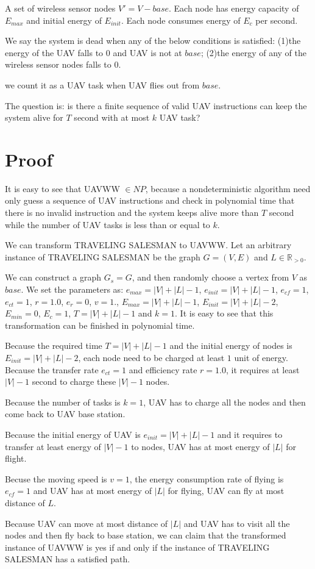 \documentclass[11pt]{article}
\begin{document}
A set of wireless sensor nodes $V' = V - {base}$. Each node has energy capacity of $E_{max}$ and initial energy of $E_{init}$. Each node consumes energy of $E_{c}$ per second.

We say the system is dead when any of the below conditions is satisfied:
(1)the energy of the UAV falls to 0 and UAV is not at $base$;
(2)the energy of any of the wireless sensor nodes falls to 0.

we count it as a UAV task when UAV flies out from $base$.

The question is: is there a finite sequence of valid UAV instructions can keep the system alive for $T$ second with at most $k$ UAV task?

\section{Proof}
It is easy to see that UAVWW $\in NP$, because a nondeterministic algorithm need only guess a sequence of UAV instructions and check in polynomial time that there is no invalid instruction and the system keeps alive more than $T$ second while the number of UAV tasks is less than or equal to $k$.

We can transform TRAVELING SALESMAN to UAVWW. Let an arbitrary instance of TRAVELING SALESMAN be the graph $G = (V, E)$ and $L \in \mathbb{R}_{>0}$.

We can construct a graph $G_s = G$, and then randomly choose a vertex from $V$ as $base$. We set the parameters as: $e_{max} = |V| + |L| - 1$, $e_{init} = |V| + |L| - 1$, $e_{cf} = 1$, $e_{ct} = 1$, $r = 1.0$, $e_r = 0$, $v = 1$., $E_{max} = |V| + |L| - 1$, $E_{init} = |V| + |L| - 2$, $E_{min} = 0$, $E_{c} = 1$, $T = |V| + |L| - 1$ and $k = 1$. It is easy to see that this transformation can be finished in polynomial time.

Because the required time $T = |V| + |L| - 1$ and the initial energy of nodes is $E_{init} = |V| + |L| - 2$, each node need to be charged at least $1$ unit of energy. Because the transfer rate $e_{ct} = 1$ and efficiency rate $r = 1.0$, it requires at least $|V| - 1$ second to charge these $|V| - 1$ nodes.

Because the number of tasks is $k = 1$, UAV has to charge all the nodes and then come back to UAV base station.

Because the initial energy of UAV is $e_{init} = |V| + |L| - 1$ and it requires to transfer at least energy of $|V| - 1$ to nodes, UAV has at most energy of $|L|$ for flight. 

Becuse the moving speed is $v = 1$, the energy consumption rate of flying is  $e_{cf} = 1$ and UAV has at most energy of $|L|$ for flying, UAV can fly at most distance of $L$.

Because UAV can move at most distance of $|L|$ and UAV has to visit all the nodes and then fly back to base station, we can claim that the transformed instance of UAVWW is yes if and only if the instance of TRAVELING SALESMAN has a satisfied path.
\end{document}
